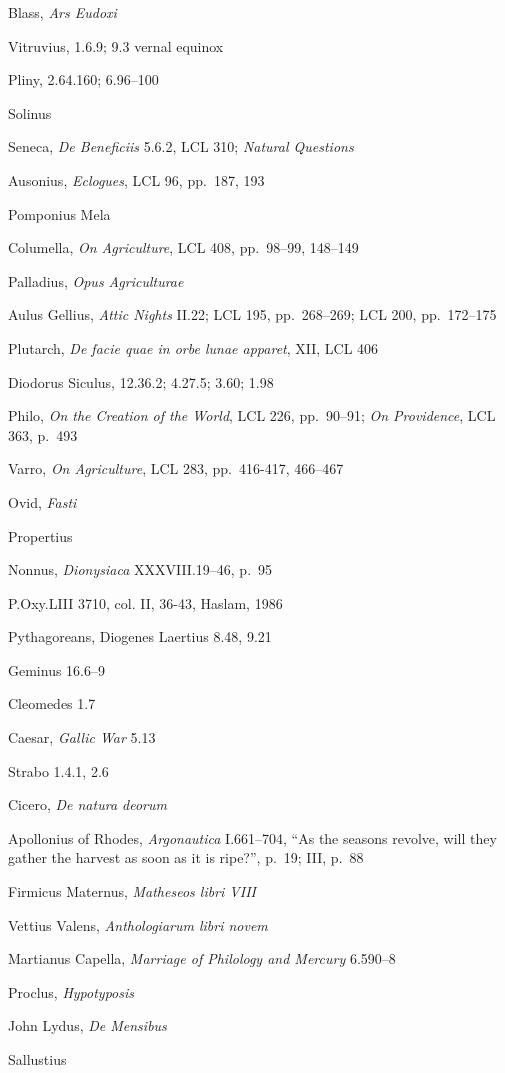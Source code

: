 \documentclass{article}
\begin{document}
Blass, {\em Ars Eudoxi} 

Vitruvius, 1.6.9; 9.3 vernal equinox

Pliny, 2.64.160; 6.96--100

Solinus

Seneca, {\em De Beneficiis} 5.6.2, LCL 310; {\em Natural Questions}

Ausonius, {\em Eclogues}, LCL 96, pp.~187, 193

Pomponius Mela

Columella, {\em On Agriculture}, LCL 408, pp.~98--99, 148--149

Palladius, {\em Opus Agriculturae}

Aulus Gellius, {\em Attic Nights} II.22; LCL 195, pp.~268--269; LCL 200, pp.~172--175

Plutarch, {\em De facie quae in orbe lunae apparet}, XII, LCL 406

Diodorus Siculus, 12.36.2; 4.27.5; 3.60; 1.98

Philo, {\em On the Creation of the World}, LCL 226, pp.~90--91; {\em On Providence}, LCL 363, p.~493

Varro, {\em On Agriculture}, LCL 283, pp.~416-417, 466--467

Ovid, {\em Fasti}

Propertius

Nonnus, {\em Dionysiaca} XXXVIII.19--46, p.~95

P.Oxy.LIII 3710, col. II, 36-43, Haslam, 1986

Pythagoreans, Diogenes Laertius 8.48, 9.21 

Geminus 16.6--9

Cleomedes 1.7

Caesar, {\em Gallic War} 5.13

Strabo 1.4.1, 2.6

Cicero, {\em De natura deorum}

Apollonius of Rhodes, {\em Argonautica} I.661--704, ``As the seasons revolve, will they gather the harvest as soon as 
it is ripe?'', p.~19; III, p.~88

Firmicus Maternus, {\em Matheseos libri VIII}

Vettius Valens, {\em Anthologiarum libri novem}

Martianus Capella, {\em Marriage of Philology and Mercury} 6.590--8

Proclus, {\em Hypotyposis}

John Lydus, {\em De Mensibus}

Sallustius
\end{document}
